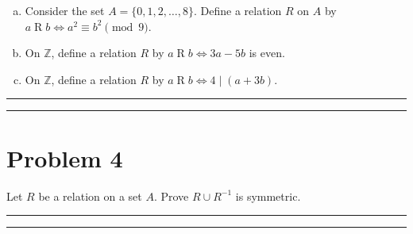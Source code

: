 \documentclass{article}
\theoremstyle{definition}
\newenvironment{solution}{\bigskip\hrule{\hfill}}{\bigskip\hrule{\hfill}} %
\begin{document}
\begin{enumerate}[a)] %
    \item Consider the set $A=\{0,1,2,\dots,8\}$. Define a relation $R$ on $A$ by $a\mathrel{R}b\Longleftrightarrow a^2\equiv b^2\pmod{9}$.
    \item On $\mathbb{Z}$, define a relation $R$ by $a\mathrel{R}b\Longleftrightarrow 3a-5b$ is even.
    \item On $\mathbb{Z}$, define a relation $R$ by $a\mathrel{R}b\Longleftrightarrow 4\mid\left(a+3b\right)$.
\end{enumerate}
\begin{solution}


\end{solution}


\newpage


\section*{Problem 4}
Let $R$ be a relation on a set $A$. Prove $R\cup R^{-1}$ is symmetric.
\begin{solution}


\end{solution}


\newpage

\end{document}
